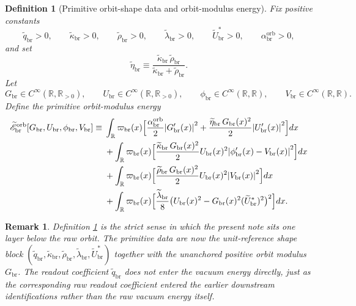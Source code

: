 \documentclass[11pt]{article}
\newcommand{\ProfWeight}{\varpi_{\mathrm{br}}}
\newcommand{\RespVacAmp}{U_{\mathrm{br}}}
\newcommand{\RespVacPhase}{\phi_{\mathrm{br}}}
\newcommand{\RespVacCarrier}{V_{\mathrm{br}}}
\newcommand{\RespShapeReadout}{\widetilde q_{\mathrm{br}}}
\newcommand{\RespShapeCov}{\widetilde\kappa_{\mathrm{br}}}
\newcommand{\RespShapeRelax}{\widetilde\rho_{\mathrm{br}}}
\newcommand{\RespShapeWell}{\widetilde\lambda_{\mathrm{br}}}
\newcommand{\RespShapeEq}{\widetilde U_{\mathrm{br}}^{\ast}}
\newcommand{\RespShapeIso}{\widetilde\eta_{\mathrm{br}}}
\newcommand{\RespOrbitField}{G_{\mathrm{br}}}
\newcommand{\RespOrbitGrad}{\alpha_{\mathrm{br}}^{\mathrm{orb}}}
\newcommand{\RespOrbitEnergy}{\widetilde{\mathscr E}_{\mathrm{br}}^{\mathrm{orb}}}
\newtheorem{definition}{Definition}
\newtheorem{remark}{Remark}
\begin{document}
\begin{definition}[Primitive orbit-shape data and orbit-modulus energy]
\label{def:orbitlift}
Fix positive constants
\begin{equation}
\RespShapeReadout>0,
\qquad
\RespShapeCov>0,
\qquad
\RespShapeRelax>0,
\qquad
\RespShapeWell>0,
\qquad
\RespShapeEq>0,
\qquad
\RespOrbitGrad>0,
\label{eq:shapeconstants}
\end{equation}
and set
\begin{equation}
\RespShapeIso\equiv\frac{\RespShapeCov\,\RespShapeRelax}{\RespShapeCov+\RespShapeRelax}.
\label{eq:shapeiso}
\end{equation}
Let
\begin{equation}
\RespOrbitField\in C^\infty(\mathbb R,\mathbb R_{>0}),
\qquad
\RespVacAmp\in C^\infty(\mathbb R,\mathbb R_{>0}),
\qquad
\RespVacPhase\in C^\infty(\mathbb R,\mathbb R),
\qquad
\RespVacCarrier\in C^\infty(\mathbb R,\mathbb R).
\label{eq:orbitfields}
\end{equation}
Define the primitive orbit-modulus energy
\begin{align}
\RespOrbitEnergy[\RespOrbitField,\RespVacAmp,\RespVacPhase,\RespVacCarrier]
\equiv\;&
\int_{\mathbb R}\ProfWeight(x)\Bigl[
\frac{\RespOrbitGrad}{2}\abs{\RespOrbitField'(x)}^2
+
\frac{\RespShapeIso\,\RespOrbitField(x)^2}{2}\abs{\RespVacAmp'(x)}^2
\Bigr]dx
\nonumber\\
&+
\int_{\mathbb R}\ProfWeight(x)\Bigl[
\frac{\RespShapeCov\,\RespOrbitField(x)^2}{2}\RespVacAmp(x)^2
\abs{\RespVacPhase'(x)-\RespVacCarrier(x)}^2
\Bigr]dx
\nonumber\\
&+
\int_{\mathbb R}\ProfWeight(x)\Bigl[
\frac{\RespShapeRelax\,\RespOrbitField(x)^2}{2}\RespVacAmp(x)^2
\abs{\RespVacCarrier(x)}^2
\Bigr]dx
\nonumber\\
&+
\int_{\mathbb R}\ProfWeight(x)\Bigl[
\frac{\RespShapeWell}{8}\bigl(\RespVacAmp(x)^2-\RespOrbitField(x)^2(\RespShapeEq)^2\bigr)^2
\Bigr]dx.
\label{eq:orbitenergy}
\end{align}
\end{definition}

\begin{remark}
Definition \ref{def:orbitlift} is the strict sense in which the present note sits one layer below the raw orbit. The primitive data are now the unit-reference shape block \((\RespShapeReadout,\RespShapeCov,\RespShapeRelax,\RespShapeWell,\RespShapeEq)\) together with the unanchored positive orbit modulus \(\RespOrbitField\). The readout coefficient \(\RespShapeReadout\) does not enter the vacuum energy directly, just as the corresponding raw readout coefficient entered the earlier downstream identifications rather than the raw vacuum energy itself.
\end{remark}
\end{document}
